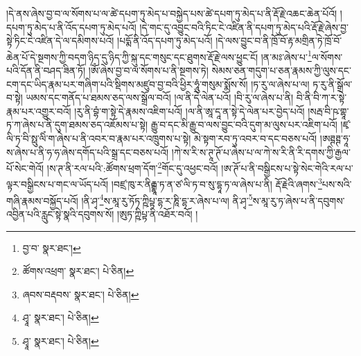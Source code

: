 །དེ་ནས་ཞེས་བྱ་བ་ལ་སོགས་པ་ལ་ཚེ་དཔག་ཏུ་མེད་པ་བསྐྱེད་པས་ཚེ་དཔག་ཏུ་མེད་པ་ནི་རྡོ་རྗེ་འཆང་ཆེན་པོའོ། །དཔག་ཏུ་མེད་པ་ནི་འོད་དཔག་ཏུ་མེད་པའོ། །དེ་གང་དུ་འབྱུང་བའི་ཏིང་ངེ་འཛིན་ནི་དཔག་ཏུ་མེད་པའི་རྡོ་རྗེ་ཞེས་བྱ་སྟེ་ཏིང་ངེ་འཛིན་དེ་ལ་དམིགས་པའོ། །པདྨོ་ནི་འོད་དཔག་ཏུ་མེད་པའོ། །དེ་ལས་བྱུང་བ་ནི་ཁྲོ་བོ་རྟ་མགྲིན་ཏེ་ཁྲོ་བོ་ཆེན་པོ་དེ་སྔགས་ཀྱི་བདག་ཉིད་དུ་ཉིད་ཀྱི་སྐུ་དང་གསུང་དང་ཐུགས་རྡོ་རྗེ་ལས་ཕྱུང་ངོ། །ན་མཿ་ཞེས་པ་\footnote{བྱ་བ་  སྣར་ཐང་། }ལ་སོགས་པའི་དོན་ནི་བཤད་ཟིན་ཏོ། །ཨོཾ་ཞེས་བྱ་བ་ལ་སོགས་པ་ནི་སྔགས་ཏེ། སེམས་ཅན་གདུག་པ་ཅན་རྣམས་ཀྱི་ལུས་དང་ངག་དང་ཡིད་རྣམ་པར་གཞིག་པའི་སྡིགས་མཛུབ་བྱ་བའི་ཕྱིར་ཧཱུཾ་གསུམ་སྨོས་སོ། །ཏ་རུ་ལ་ཞེས་པ་ལ། ཏ་རུ་ནི་སྒྲོལ་བ་སྟེ། ཡམས་དང་གནོད་པ་ཐམས་ཅད་ལས་སྒྲོལ་བའོ། །ལ་ནི་དེ་ལེན་པའོ། །བི་རུ་ལ་ཞེས་པ་ནི། བི་ནི་བི་ཀ་ར་སྟེ་རྣམ་པར་འགྱུར་བའོ། །རུ་ནི་བྷཾ་ག་སྟེ་དེ་རྣམས་འཇིག་པའོ། །ལ་ནི་ཨཱ་དཱ་ན་སྟེ་དེ་ལེན་པར་བྱེད་པའོ། །སརྦ་བི་ཥ་གྷཱ་ཏ་ཀ་ཞེས་པ་ནི་དུག་ཐམས་ཅད་འཇོམས་པ་སྟེ། རྒྱུ་བ་དང་མི་རྒྱུ་བ་ལས་བྱུང་བའི་དུག་མ་ལུས་པར་འཇིག་པའོ། །ཛྭ་ལི་ཏ་བི་སྥུ་ལིཾ་ག་ཞེས་པ་ནི་འབར་བ་རྣམ་པར་འཁྲུགས་པ་སྟེ། མེ་སྟག་རབ་ཏུ་འབར་བ་དང་བཅས་པའོ། །ཨཊྚཊྚ་ཧཱ་ས་ཞེས་པ་ནི་ཧ་ཧ་ཞེས་དགོད་པའི་སྒྲ་དང་བཅས་པའོ། །ཀེ་ས་རི་ས་ཊཱ་ཊོ་པ་ཞེས་པ་ལ་ཀེ་ས་རི་ནི་རི་དགས་ཀྱི་རྒྱལ་པོ་སེང་གེའོ། །ས་ཊ་ནི་རལ་པའི་:ཚོགས་ཕྲག་དོག་\footnote{ཚོགས་འཕྲག་  སྣར་ཐང་།  པེ་ཅིན། }གོང་དུ་འཕྱང་བའོ། །ཨ་ཊོ་པ་ནི་བསྒྱིངས་པ་སྟེ་སེང་གེའི་རལ་པ་ལྟར་བསྒྱིངས་པ་གང་ལ་ཡོད་པའོ། །བཛྲ་ཁུ་ར་ནིརྒྷཱ་ཏ་ན་ཙ་ལི་ཏ་བ་སུ་དྷཱ་ཏ་ལ་ཞེས་པ་ནི། རྡོ་རྗེའི་ཞགས་\footnote{ཞབས་བརྡབས་  སྣར་ཐང་།  པེ་ཅིན། }པས་སའི་གཞི་རྣམས་བསྐྱོད་པའོ། །ནི་ཤྭ་\footnote{ཤྭཱ་  སྣར་ཐང་།  པེ་ཅིན། }ས་མཱ་རུ་ཏོཏ་ཀྵིཔྟ་དྷ་ར་ཎཱི་དྷ་ར་ཞེས་པ་ལ། ནི་ཤྭ་\footnote{ཤྭཱ་  སྣར་ཐང་།  པེ་ཅིན། }ས་མཱ་རུ་ཏ་ཞེས་པ་ནི་དབུགས་འབྱིན་པའི་རླུང་སྟེ་སྣའི་དབུགས་སོ། །ཨུཏ་ཀྵིཔྟ་ནི་འཐོར་བའོ། །
